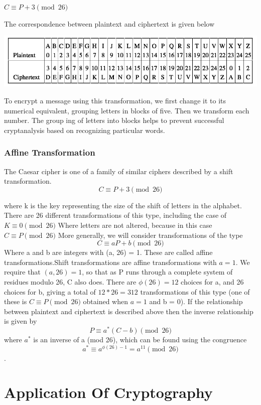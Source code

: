 \documentclass{report}
\begin{document}
{{{$C \equiv P+3\pmod{26}$

The correspondence between plaintext and ciphertext is given below}

\begin{center}
\includegraphics[scale=0.5]{"table2.png"}
\end{center}

\Large{To encrypt a message using this transformation, we first change it to its numerical
equivalent, grouping letters in blocks of five. Then we transform each number. The group­
ing of letters into blocks helps to prevent successful cryptanalysis based on recognizing
particular words.}
\subsection{Affine Transformation}
\Large{The Caesar cipher is one of a family of similar ciphers described by a shift transformation.
$$C \equiv P+3\pmod{26}$$

where k is the key representing the size of the shift of letters in the alphabet. There are
26 different transformations of this type, including the case of $K\equiv 0\pmod{26}$
Where letters are not altered, because in this case $C \equiv P\pmod{26}$ More generally, we will consider transformations of the type 
$$C \equiv aP+b\pmod{26}$$ 
Where a and b are integers with (a, 26) = 1. These are called affine transformations.Shift transformations are affine transformations with $a= 1$. We require that $(a, 26) = 1$,
so that as P runs through a complete system of residues modulo 26, C also does. There
are $\phi(26) = 12$ choices for a, and 26 choices for b, giving a total of $12*26 = 312$
transformations of this type (one of these is $C \equiv P\pmod{26}$ obtained when $a = 1$ and
b = 0). If the relationship between plaintext and ciphertext is described above then the inverse relationship is given by
$$P \equiv a^*(C-b)\pmod{26}$$ 
where $a^*$ is an inverse of a (mod 26), which can be found using the congruence $$a^* \equiv a^{\phi(26)-1} =a^{11}\pmod{26}$$.

\chapter{Application Of Cryptography }
}}}
\end{document}
